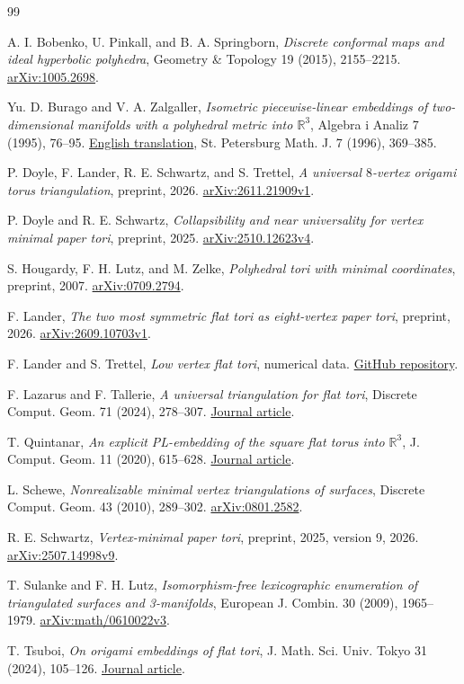 \documentclass[11pt,letterpaper]{amsart}
\newcommand{\R}{\mathbb R}
\begin{document}
\begin{thebibliography}{99}

A. I. Bobenko, U. Pinkall, and B. A. Springborn,
\emph{Discrete conformal maps and ideal hyperbolic polyhedra},
Geometry \& Topology 19 (2015), 2155--2215.
\href{https://arxiv.org/abs/1005.2698}{arXiv:1005.2698}.

Yu. D. Burago and V. A. Zalgaller,
\emph{Isometric piecewise-linear embeddings of two-dimensional
manifolds with a polyhedral metric into \(\R^3\)},
Algebra i Analiz 7 (1995), 76--95.
\href{https://www.mathnet.ru/eng/aa555}{English translation}, St. Petersburg Math. J. 7
(1996), 369--385.

P. Doyle, F. Lander, R. E. Schwartz, and S. Trettel,
\emph{A universal \(8\)-vertex origami torus triangulation},
preprint, 2026.
\href{https://arxiv.org/abs/2611.21909v1}{arXiv:2611.21909v1}.

P. Doyle and R. E. Schwartz,
\emph{Collapsibility and near universality for vertex minimal paper tori},
preprint, 2025.
\href{https://arxiv.org/abs/2510.12623v4}{arXiv:2510.12623v4}.

S. Hougardy, F. H. Lutz, and M. Zelke,
\emph{Polyhedral tori with minimal coordinates},
preprint, 2007.
\href{https://arxiv.org/abs/0709.2794}{arXiv:0709.2794}.

F. Lander,
\emph{The two most symmetric flat tori as eight-vertex paper tori},
preprint, 2026.
\href{https://arxiv.org/abs/2609.10703v1}{arXiv:2609.10703v1}.

F. Lander and S. Trettel,
\emph{Low vertex flat tori}, numerical data.
\href{https://github.com/FabianLander/low-vertex-flat-tori}{GitHub repository}.

F. Lazarus and F. Tallerie,
\emph{A universal triangulation for flat tori},
Discrete Comput. Geom. 71 (2024), 278--307.
\href{https://doi.org/10.1007/s00454-023-00598-7}{Journal article}.

T. Quintanar,
\emph{An explicit PL-embedding of the square flat torus into \(\R^3\)},
J. Comput. Geom. 11 (2020), 615--628.
\href{https://jocg.org/index.php/jocg/article/view/3114}{Journal article}.

L. Schewe,
\emph{Nonrealizable minimal vertex triangulations of surfaces},
Discrete Comput. Geom. 43 (2010), 289--302.
\href{https://arxiv.org/abs/0801.2582}{arXiv:0801.2582}.

R. E. Schwartz,
\emph{Vertex-minimal paper tori},
preprint, 2025, version 9, 2026.
\href{https://arxiv.org/abs/2507.14998v9}{arXiv:2507.14998v9}.

T. Sulanke and F. H. Lutz,
\emph{Isomorphism-free lexicographic enumeration of triangulated
surfaces and 3-manifolds},
European J. Combin. 30 (2009), 1965--1979.
\href{https://arxiv.org/abs/math/0610022v3}{arXiv:math/0610022v3}.

T. Tsuboi,
\emph{On origami embeddings of flat tori},
J. Math. Sci. Univ. Tokyo 31 (2024), 105--126.
\href{https://www.ms.u-tokyo.ac.jp/journal/31-2-1.pdf}{Journal article}.

\end{thebibliography}
\end{document}
